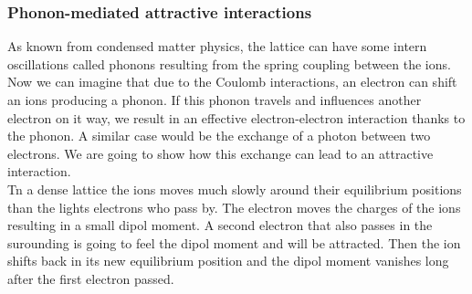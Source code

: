 \documentclass[../main.tex]{subfile}
\begin{document}
\subsubsection{Phonon-mediated attractive interactions }
As known from condensed matter physics, the lattice can have some intern oscillations called phonons resulting from the spring coupling between the ions.
Now we can imagine that due to the Coulomb interactions, an electron can shift an ions producing a phonon. If this phonon travels and influences another electron
on it way, we result in an effective electron-electron interaction thanks to the phonon. A similar case would be the exchange of a photon between two electrons.
We are going to show how this exchange can lead to an attractive interaction.\\

Tn a dense lattice the ions moves much slowly around their equilibrium positions than the lights electrons who pass by. The electron moves the charges of the ions resulting
in a small dipol moment. A second electron that also passes in the surounding is going to feel the dipol moment and will be 
attracted. Then the ion shifts back in its new equilibrium position and the dipol moment vanishes long after the first electron passed.\\
\end{document}
